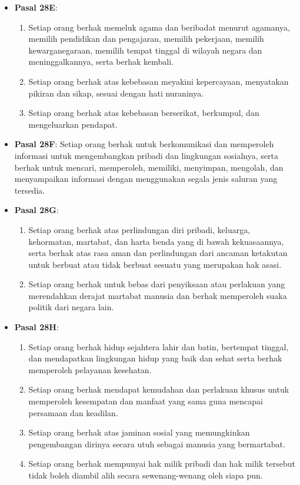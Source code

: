 \begin{itemize}
    \item \textbf{Pasal 28E}:
    \begin{enumerate}
        \item Setiap orang berhak memeluk agama dan beribadat menurut agamanya, memilih pendidikan dan pengajaran, memilih pekerjaan, memilih kewarganegaraan, memilih tempat tinggal di wilayah negara dan meninggalkannya, serta berhak kembali.
        \item Setiap orang berhak atas kebebasan meyakini kepercayaan, menyatakan pikiran dan sikap, sesuai dengan hati nuraninya.
        \item Setiap orang berhak atas kebebasan berserikat, berkumpul, dan mengeluarkan pendapat.
    \end{enumerate}
    \item \textbf{Pasal 28F}: Setiap orang berhak untuk berkomunikasi dan memperoleh informasi untuk mengembangkan pribadi dan lingkungan sosialnya, serta berhak untuk mencari, memperoleh, memiliki, menyimpan, mengolah, dan menyampaikan informasi dengan menggunakan segala jenis saluran yang tersedia.
    \item \textbf{Pasal 28G}:
    \begin{enumerate}
        \item Setiap orang berhak atas perlindungan diri pribadi, keluarga, kehormatan, martabat, dan harta benda yang di bawah kekuasaannya, serta berhak atas rasa aman dan perlindungan dari ancaman ketakutan untuk berbuat atau tidak berbuat sesuatu yang merupakan hak asasi.
        \item Setiap orang berhak untuk bebas dari penyiksaan atau perlakuan yang merendahkan derajat martabat manusia dan berhak memperoleh suaka politik dari negara lain.
    \end{enumerate}
    \item \textbf{Pasal 28H}:
    \begin{enumerate}
        \item Setiap orang berhak hidup sejahtera lahir dan batin, bertempat tinggal, dan mendapatkan lingkungan hidup yang baik dan sehat serta berhak memperoleh pelayanan kesehatan.
        \item Setiap orang berhak mendapat kemudahan dan perlakuan khusus untuk memperoleh kesempatan dan manfaat yang sama guna mencapai persamaan dan keadilan.
        \item Setiap orang berhak atas jaminan sosial yang memungkinkan pengembangan dirinya secara utuh sebagai manusia yang bermartabat.
        \item Setiap orang berhak mempunyai hak milik pribadi dan hak milik tersebut tidak boleh diambil alih secara sewenang-wenang oleh siapa pun.

\end{enumerate}
\end{itemize}
